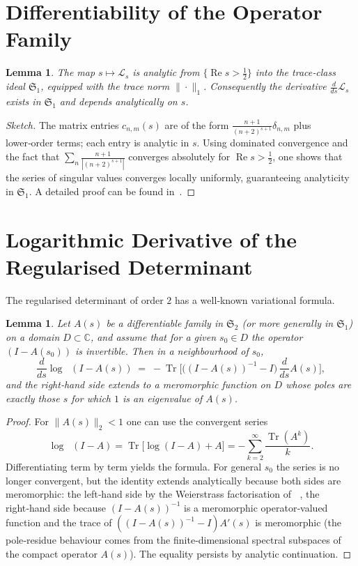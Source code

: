 \documentclass[11pt,a4paper]{article}
\newtheorem{lemma}[theorem]{Lemma}
\newcommand{\C}{\mathbb{C}}
\newcommand{\LOp}{\mathcal{L}}
\newcommand{\Tr}{\operatorname{Tr}}
\newcommand{\RE}{\operatorname{Re}}
\DeclareMathOperator{\detreg}{det_{(2)}}
\begin{document}
\section{Differentiability of the Operator Family}

\begin{lemma}\label{lem:diff-trace}
The map $s \mapsto \LOp_s$ is analytic from $\{\RE s > \tfrac12\}$ into the trace‑class ideal $\mathfrak{S}_1$, equipped with the trace norm $\|\cdot\|_1$.  Consequently the derivative $\frac{d}{ds}\LOp_s$ exists in $\mathfrak{S}_1$ and depends analytically on $s$.
\end{lemma}
\begin{proof}[Sketch]
The matrix entries $c_{n,m}(s)$ are of the form $\frac{n+1}{(n+2)^{s+1}}\delta_{n,m}$ plus lower‑order terms; each entry is analytic in $s$.  Using dominated convergence and the fact that $\sum_{n} \frac{n+1}{|(n+2)^{s+1}|}$ converges absolutely for $\RE s > \tfrac12$, one shows that the series of singular values converges locally uniformly, guaranteeing analyticity in $\mathfrak{S}_1$.  A detailed proof can be found in~\cite{Geere2026,Simon}.
\end{proof}

\section{Logarithmic Derivative of the Regularised Determinant}

The regularised determinant of order $2$ has a well‑known variational formula.

\begin{lemma}\label{lem:logderiv}
Let $A(s)$ be a differentiable family in $\mathfrak{S}_2$ (or more generally in $\mathfrak{S}_1$) on a domain $D\subset \C$, and assume that for a given $s_0\in D$ the operator $(I-A(s_0))$ is invertible. Then in a neighbourhood of $s_0$,
\[
\frac{d}{ds}\log\detreg(I - A(s)) \;=\; -\Tr\!\Big[ \big((I - A(s))^{-1} - I\big)\, \frac{d}{ds}A(s) \Big],
\]
and the right‑hand side extends to a meromorphic function on $D$ whose poles are exactly those $s$ for which $1$ is an eigenvalue of $A(s)$.
\end{lemma}
\begin{proof}
For $\|A(s)\|_2 < 1$ one can use the convergent series
\[
\log\detreg(I - A) = \Tr\big[\log(I - A) + A\big] = -\sum_{k=2}^\infty \frac{\Tr(A^k)}{k}.
\]
Differentiating term by term yields the formula.  For general $s_0$ the series is no longer convergent, but the identity extends analytically because both sides are meromorphic: the left‑hand side by the Weierstrass factorisation of $\detreg$, the right‑hand side because $(I - A(s))^{-1}$ is a meromorphic operator‑valued function and the trace of $((I - A(s))^{-1} - I)A'(s)$ is meromorphic (the pole‑residue behaviour comes from the finite‑dimensional spectral subspaces of the compact operator $A(s)$).  The equality persists by analytic continuation.
\end{proof}
\end{document}
